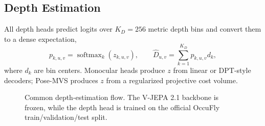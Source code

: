\subsection{Depth Estimation}
\label{sec:method_depth_heads}

All depth heads predict logits over $K_D=256$ metric depth bins and convert them to a dense expectation,
\begin{equation}
    p_{k,u,v}=\operatorname{softmax}_k(z_{k,u,v}),
    \qquad
    \hat{D}_{u,v}=\sum_{k=1}^{K_D}p_{k,u,v}d_k,
    \label{eq:depth_estimate}
\end{equation}
where $d_k$ are bin centers. Monocular heads produce $z$ from linear or DPT-style decoders; Pose-MVS produces $z$ from a regularized projective cost volume.

\begin{figure}[t]
\centering
{}
\caption{Common depth-estimation flow. The V-JEPA 2.1 backbone is frozen, while the depth head is trained on the official OccuFly train/validation/test split.}
\label{fig:depth_flow}
\end{figure}

